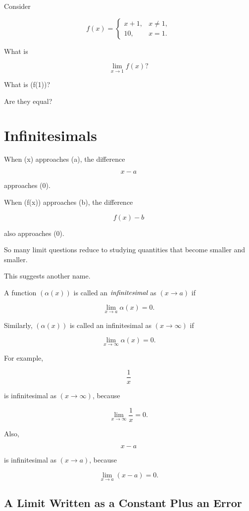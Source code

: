 Consider

\[
f(x)=
\begin{cases}
x+1, & x\neq 1,\\
10, & x=1.
\end{cases}
\]

What is

\[
\lim_{x\to 1}f(x)?
\]

What is (f(1))?

Are they equal?

\section{Infinitesimals}

When (x) approaches (a), the difference

\[
x-a
\]

approaches (0).

When (f(x)) approaches (b), the difference

\[
f(x)-b
\]

also approaches (0).

So many limit questions reduce to studying quantities that become smaller and smaller.

This suggests another name.

\begin{definition}
A function $(\alpha(x))$ is called an $\emph{infinitesimal}$ as $(x\to a)$ if

\[
\lim_{x\to a}\alpha(x)=0.
\]

Similarly, $(\alpha(x))$ is called an infinitesimal as $(x\to\infty)$ if

\[
\lim_{x\to\infty}\alpha(x)=0.
\]
\end{definition}

For example,

\[
\frac{1}{x}
\]

is infinitesimal as $(x\to\infty)$, because

\[
\lim_{x\to\infty}\frac{1}{x}=0.
\]

Also,

\[
x-a
\]

is infinitesimal as $(x\to a)$, because

\[
\lim_{x\to a}(x-a)=0.
\]

\subsection{A Limit Written as a Constant Plus an Error}

